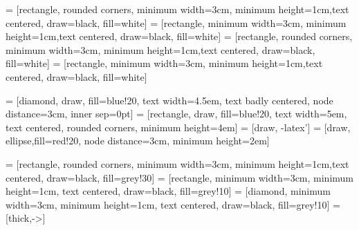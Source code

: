  = [rectangle, rounded corners, minimum width=3cm, minimum height=1cm,text centered, draw=black, fill=white]
 = [rectangle, minimum width=3cm, minimum height=1cm,text centered, draw=black, fill=white]
 = [rectangle, rounded corners, minimum width=3cm, minimum height=1cm,text centered, draw=black, fill=white]
 = [rectangle, minimum width=3cm, minimum height=1cm,text centered, draw=black, fill=white]

 = [diamond, draw, fill=blue!20, text width=4.5em, text badly centered, node distance=3cm, inner sep=0pt]
 = [rectangle, draw, fill=blue!20, text width=5em, text centered, rounded corners, minimum height=4em]
 = [draw, -latex']
 = [draw, ellipse,fill=red!20, node distance=3cm, minimum height=2em]

 = [rectangle, rounded corners, minimum width=3cm, minimum height=1cm,text centered, draw=black, fill=grey!30]
 = [rectangle, minimum width=3cm, minimum height=1cm, text centered, draw=black, fill=grey!10]
 = [diamond, minimum width=3cm, minimum height=1cm, text centered, draw=black, fill=grey!10]
 = [thick,->]